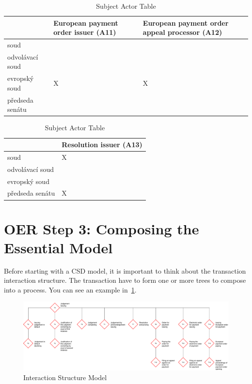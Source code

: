 \begin{landscape}
\begin{table}[h]
\caption{Subject Actor Table}
\label{tab:subjectactortable}
\begin{tabular}{|l|l|l|}
\hline
    &  European payment order issuer  (A11) &   European payment order appeal processor (A12)   \\ \hline
soud &  &    \\ \hline
odvolávací soud &  &   \\ \hline
evropský soud & X & X \\ \hline
předseda senátu &  &    \\ \hline
\end{tabular}
\end{table}

\begin{table}[h]
  \caption{Subject Actor Table}
  \label{tab:subjectactortable}
  \begin{tabular}{|l|l|}
  \hline
   &  Resolution issuer (A13) \\ \hline
soud & X \\ \hline
odvolávací soud & \\ \hline
evropský soud & \\ \hline
předseda senátu & X \\ \hline
\end{tabular}
\end{table}


\end{landscape}

\section{OER Step 3: Composing the Essential Model}

Before starting with a CSD model, it is important to think about the transaction interaction structure. The transaction have to form one or more trees to compose into a process. You can see an example in~\cref{fig:interactionStructure}. 

\begin{landscape}

\begin{figure}[h]\centering
	\includegraphics[width=22cm]{pic/tree}
	\caption{Interaction Structure Model}
	\label{fig:interactionStructure}
\end{figure}

\end{landscape}


